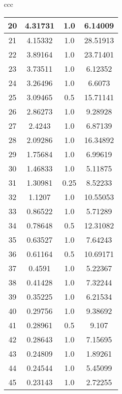 \documentclass{article}
\begin{document}
\begin{center}
\begin{tabular}{ccc}
\begin{tabular}{|c|c|c|c|}
            \hline
            20 & 4.31731 & 1.0 & 6.14009 \\ 
            \hline
            21 & 4.15332 & 1.0 & 28.51913 \\ 
            \hline
            22 & 3.89164 & 1.0 & 23.71401 \\ 
            \hline
            23 & 3.73511 & 1.0 & 6.12352 \\ 
            \hline
            24 & 3.26496 & 1.0 & 6.6073 \\ 
            \hline
            25 & 3.09465 & 0.5 & 15.71141 \\ 
            \hline
            26 & 2.86273 & 1.0 & 9.28928 \\ 
            \hline
            27 & 2.4243 & 1.0 & 6.87139 \\ 
            \hline
            28 & 2.09286 & 1.0 & 16.34892 \\ 
            \hline
            29 & 1.75684 & 1.0 & 6.99619 \\ 
            \hline
            30 & 1.46833 & 1.0 & 5.11875 \\ 
            \hline
            31 & 1.30981 & 0.25 & 8.52233 \\ 
            \hline
            32 & 1.1207 & 1.0 & 10.55053 \\ 
            \hline
            33 & 0.86522 & 1.0 & 5.71289 \\ 
            \hline
            34 & 0.78648 & 0.5 & 12.31082 \\ 
            \hline
            35 & 0.63527 & 1.0 & 7.64243 \\ 
            \hline
            36 & 0.61164 & 0.5 & 10.69171 \\ 
            \hline
            37 & 0.4591 & 1.0 & 5.22367 \\ 
            \hline
            38 & 0.41428 & 1.0 & 7.32244 \\ 
            \hline
            39 & 0.35225 & 1.0 & 6.21534 \\ 
            \hline
            40 & 0.29756 & 1.0 & 9.38692 \\ 
            \hline
            41 & 0.28961 & 0.5 & 9.107 \\ 
            \hline
            42 & 0.28643 & 1.0 & 7.15695 \\ 
            \hline
            43 & 0.24809 & 1.0 & 1.89261 \\ 
            \hline
            44 & 0.24544 & 1.0 & 5.45099 \\ 
            \hline
            45 & 0.23143 & 1.0 & 2.72255 \\ 
            \hline


\end{tabular}
\end{tabular}
\end{center}
\end{document}
